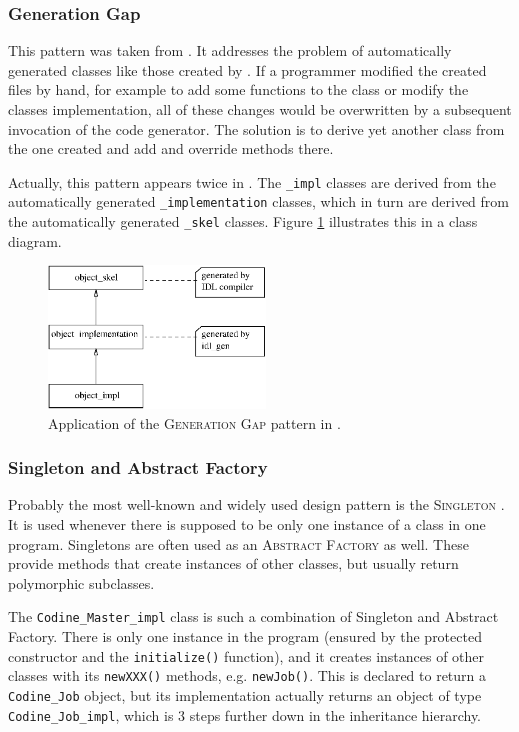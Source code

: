 \subsubsection{Generation Gap}
This pattern was taken from \cite[pp. 85-101]{b_vlissides}. It addresses the
problem of automatically generated classes like those created by \idlgen. If a
programmer modified the created files by hand, for example to add some
functions to the class or modify the classes implementation, all of these
changes would be overwritten by a subsequent invocation of the code
generator. The solution is to derive yet another class from the one created
and add and override methods there.

Actually, this pattern appears twice in \qidl. The \texttt{\_impl}
classes are derived from the automatically generated \texttt{\_implementation}
classes, which in turn are derived from the automatically generated
\texttt{\_skel} classes. Figure \ref{f_prog_generation_gap} illustrates this
in a class diagram.

\begin{figure}
\begin{center}
\includegraphics[height=3.8cm]{generationgap.eps}
\end{center}
\caption{\label{f_prog_generation_gap}Application of the \textsc{Generation
Gap} pattern in \qidl.}
\end{figure}

\subsubsection{\label{s_prog_singleton}Singleton and Abstract Factory}
Probably the most well-known and widely used design pattern is the
\textsc{Singleton} \cite[pp. 127-134]{b_gof}. It is used whenever there is
supposed to be only one instance of a class in one program. Singletons are
often used as an \textsc{Abstract Factory} \cite[pp. 87-95]{b_gof} as well.
These provide methods that create instances of other classes, but usually
return polymorphic subclasses.

The \texttt{Codine\_Master\_impl} class is such a combination of Singleton
and Abstract Factory. There is only one instance in the program (ensured by
the protected constructor and the \texttt{initialize()} function), and it
creates instances of other classes with its \texttt{newXXX()} methods, e.g.
\texttt{newJob()}. This is declared to return a \texttt{Codine\_Job} object,
but its implementation actually returns an object of type
\texttt{Codine\_Job\_impl}, which is 3 steps further down in the inheritance
hierarchy.

